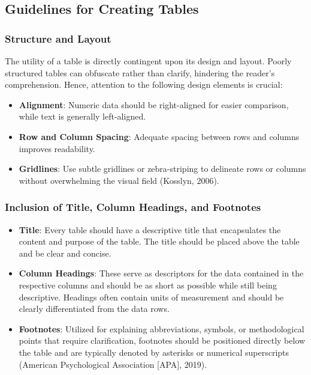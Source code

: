 \documentclass[
  b5paper]{book}
\providecommand{\tightlist}{%
  \setlength{\itemsep}{0pt}\setlength{\parskip}{0pt}}
\begin{document}
\hypertarget{guidelines-for-creating-tables}{%
\subsection{Guidelines for Creating Tables}\label{guidelines-for-creating-tables}}

\hypertarget{structure-and-layout}{%
\subsubsection{Structure and Layout}\label{structure-and-layout}}

The utility of a table is directly contingent upon its design and layout. Poorly structured tables can obfuscate rather than clarify, hindering the reader's comprehension. Hence, attention to the following design elements is crucial:

\begin{itemize}
\tightlist
\item
  \textbf{Alignment}: Numeric data should be right-aligned for easier comparison, while text is generally left-aligned.
\item
  \textbf{Row and Column Spacing}: Adequate spacing between rows and columns improves readability.
\item
  \textbf{Gridlines}: Use subtle gridlines or zebra-striping to delineate rows or columns without overwhelming the visual field (Kosslyn, 2006).
\end{itemize}

\hypertarget{inclusion-of-title-column-headings-and-footnotes}{%
\subsubsection{Inclusion of Title, Column Headings, and Footnotes}\label{inclusion-of-title-column-headings-and-footnotes}}

\begin{itemize}
\item
  \textbf{Title}: Every table should have a descriptive title that encapsulates the content and purpose of the table. The title should be placed above the table and be clear and concise.
\item
  \textbf{Column Headings}: These serve as descriptors for the data contained in the respective columns and should be as short as possible while still being descriptive. Headings often contain units of measurement and should be clearly differentiated from the data rows.
\item
  \textbf{Footnotes}: Utilized for explaining abbreviations, symbols, or methodological points that require clarification, footnotes should be positioned directly below the table and are typically denoted by asterisks or numerical superscripts (American Psychological Association {[}APA{]}, 2019).
\end{itemize}
\end{document}
